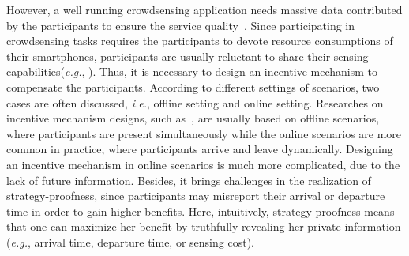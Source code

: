\documentclass[10pt,journal,letterpaper,compsoc]{IEEEtran}
\newcommand{\ie}{{\em i.e.}}
\newcommand{\eg}{{\em e.g.}}
\begin{document}
However, a well running crowdsensing application needs massive data contributed by the participants to ensure the service quality~\cite{Wang:2015:CQO:2750858.2807513,Han:2016:PPR:2942358.2942385}. Since participating in crowdsensing tasks requires the participants to devote resource consumptions of their smartphones, participants are usually reluctant to share their sensing capabilities(\eg, \cite{Kawajiri:2014:SCI:2632048.2636064,Fan:2015:PTT:2789168.2795179,Karaliopoulos:2016:FLE:2942358.2942369}). Thus, it is necessary to design an incentive mechanism to compensate the participants. According to different settings of scenarios, two cases are often discussed, \ie, offline setting and online setting. Researches on incentive mechanism designs, such as~\cite{yang2012crowdsourcing,koutsopoulos2013optimal}, are usually based on offline scenarios, where participants are present simultaneously while the online scenarios are more common in practice, where participants arrive and leave dynamically. Designing an incentive mechanism in online scenarios is much more complicated, due to the lack of future information. Besides, it brings challenges in the realization of strategy-proofness, since participants may misreport their arrival or departure time in order to gain higher benefits. Here, intuitively, strategy-proofness means that one can maximize her benefit by truthfully revealing her private information (\eg, arrival time, departure time, or sensing cost).

\end{document}
